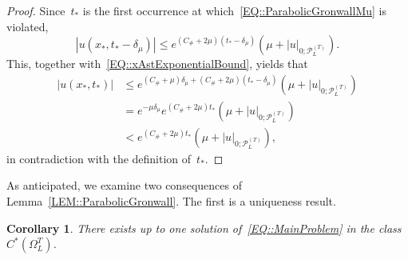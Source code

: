 \documentclass[12pt,a4paper]{amsart}
\numberwithin{equation}{section}
\newtheorem{corollary}[theorem]{Corollary}
\theoremstyle{definition}
\theoremstyle{remark}
\newcommand{\abs}[1]{\left\lvert#1\right\rvert}
\renewcommand{\leq}{\leqslant}
\begin{document}
\begin{proof}
    Since~$t_\ast$ is the first occurrence at which~\eqref{EQ::ParabolicGronwallMu} is violated,
    \begin{equation}
        \abs{u(x_\ast, t_\ast-\delta_\mu)} \leq e^{(C_\# + 2\mu)(t_\ast-\delta_\mu)}\left(\mu + \abs{u}_{0; \mathcal{P}_L^{(T)}}\right).
    \end{equation}
    This, together with~\eqref{EQ::xAstExponentialBound}, yields that
    \begin{align}
        \abs{u(x_\ast, t_\ast)} &\leq e^{(C_\# + \mu)\delta_\mu+(C_\# + 2\mu)(t_\ast-\delta_\mu)}\left(\mu + \abs{u}_{0; \mathcal{P}_L^{(T)}}\right)\\
            &= e^{-\mu\delta_\mu}e^{(C_\# + 2\mu)t_\ast}\left(\mu + \abs{u}_{0; \mathcal{P}_L^{(T)}}\right)\\
            &<e^{(C_\#+2\mu)t_\ast}\left(\mu + \abs{u}_{0; \mathcal{P}_L^{(T)}}\right),
    \end{align}
    in contradiction with the definition of~$t_\ast$.
\end{proof}

As anticipated, we examine two consequences of Lemma~\ref{LEM::ParabolicGronwall}. The first is a uniqueness result.

\begin{corollary}\label{COR::NonlinearUniqueness}
    There exists up to one solution of~\eqref{EQ::MainProblem} in the class~$C^\ast\left(\Omega_L^T\right)$.
\end{corollary}
\end{document}
